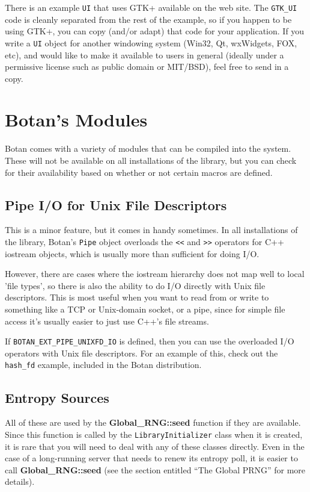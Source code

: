\documentclass{article}
\newcommand{\filename}[1]{\texttt{#1}}
\newcommand{\macro}[1]{\texttt{#1}}
\newcommand{\function}[1]{\textbf{#1}}
\newcommand{\keyword}[1]{\texttt{#1}}
\newcommand{\type}[1]{\texttt{#1}}
\begin{document}
There is an example \type{UI} that uses GTK+ available on the web site. The
\type{GTK\_UI} code is cleanly separated from the rest of the example, so if
you happen to be using GTK+, you can copy (and/or adapt) that code for your
application. If you write a \type{UI} object for another windowing system
(Win32, Qt, wxWidgets, FOX, etc), and would like to make it available to users
in general (ideally under a permissive license such as public domain or
MIT/BSD), feel free to send in a copy.

\section{Botan's Modules}

Botan comes with a variety of modules that can be compiled into the system.
These will not be available on all installations of the library, but you can
check for their availability based on whether or not certain macros are
defined.

\subsection{Pipe I/O for Unix File Descriptors}

This is a minor feature, but it comes in handy sometimes. In all
installations of the library, Botan's \type{Pipe} object overloads the
\keyword{<<} and \keyword{>>} operators for C++ iostream objects,
which is usually more than sufficient for doing I/O.

However, there are cases where the iostream hierarchy does not map well to
local 'file types', so there is also the ability to do I/O directly with Unix
file descriptors. This is most useful when you want to read from or write to
something like a TCP or Unix-domain socket, or a pipe, since for simple file
access it's usually easier to just use C++'s file streams.

If \macro{BOTAN\_EXT\_PIPE\_UNIXFD\_IO} is defined, then you can use the
overloaded I/O operators with Unix file descriptors. For an example of this,
check out the \filename{hash\_fd} example, included in the Botan distribution.

\subsection{Entropy Sources}

All of these are used by the \function{Global\_RNG::seed} function if
they are available. Since this function is called by the
\type{LibraryInitializer} class when it is created, it is rare
that you will need to deal with any of these classes directly. Even in
the case of a long-running server that needs to renew its entropy
poll, it is easier to call \function{Global\_RNG::seed} (see the
section entitled ``The Global PRNG'' for more details).
\end{document}
